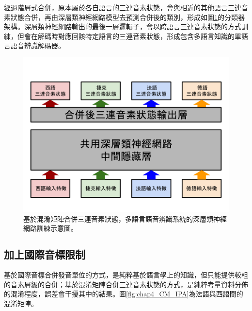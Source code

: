 經過階層式合併，原本屬於各自語言的三連音素狀態，會與相近的其他語言三連音素狀態合併，再由深層類神經網路模型去預測合併後的類別，形成如圖\ref{fig:chap4_CM_merged_unit}的分類器架構。深層類神經網路輸出的最後一層邏輯子，會以跨語言三連音素狀態的方式訓練，但會在解碼時對應回該特定語言的三連音素狀態，形成包含多語言知識的單語言語音辨識解碼器。
\begin{figure}[!h]
\centering
\includegraphics[scale=0.4]{images/chap4_CM_merged_unit}
\caption{基於混淆矩陣合併三連音素狀態，多語言語音辨識系統的深層類神經網路訓練示意圖。}
\label{fig:chap4_CM_merged_unit}
\end{figure}

\subsection{加上國際音標限制}
基於國際音標合併發音單位的方式，是純粹基於語言學上的知識，但只能提供較粗的音素層級的合併；基於混淆矩陣合併三連音素狀態的方式，是純粹考量資料分佈的混淆程度，誤差會干擾其中的結果。圖\ref{fig:chap4_CM_IPA}為法語與西語間的混淆矩陣。


